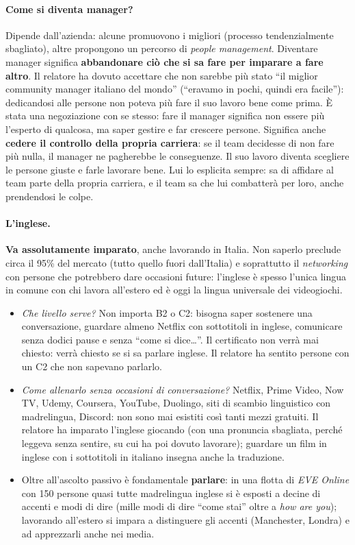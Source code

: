 \paragraph{Come si diventa manager?} Dipende dall'azienda: alcune promuovono i
migliori (processo tendenzialmente sbagliato), altre propongono un percorso di
\emph{people management}. Diventare manager significa \textbf{abbandonare ciò
che si sa fare per imparare a fare altro}. Il relatore ha dovuto accettare che
non sarebbe più stato ``il miglior community manager italiano del mondo''
(``eravamo in pochi, quindi era facile''): dedicandosi alle persone non poteva
più fare il suo lavoro bene come prima. È stata una negoziazione con se
stesso: fare il manager significa non essere più l'esperto di qualcosa, ma
saper gestire e far crescere persone. Significa anche \textbf{cedere il
controllo della propria carriera}: se il team decidesse di non fare più nulla,
il manager ne pagherebbe le conseguenze. Il suo lavoro diventa scegliere le
persone giuste e farle lavorare bene. Lui lo esplicita sempre: sa di affidare
al team parte della propria carriera, e il team sa che lui combatterà per
loro, anche prendendosi le colpe.

\paragraph{L'inglese.} \textbf{Va assolutamente imparato}, anche lavorando in
Italia. Non saperlo preclude circa il 95\% del mercato (tutto quello fuori
dall'Italia) e soprattutto il \emph{networking} con persone che potrebbero dare
occasioni future: l'inglese è spesso l'unica lingua in comune con chi lavora
all'estero ed è oggi la lingua universale dei videogiochi.
\begin{itemize}
  \item \emph{Che livello serve?} Non importa B2 o C2: bisogna saper sostenere
        una conversazione, guardare almeno Netflix con sottotitoli in inglese,
        comunicare senza dodici pause e senza ``come si dice\dots''. Il
        certificato non verrà mai chiesto: verrà chiesto se si sa parlare
        inglese. Il relatore ha sentito persone con un C2 che non sapevano
        parlarlo.
  \item \emph{Come allenarlo senza occasioni di conversazione?} Netflix, Prime
        Video, Now TV, Udemy, Coursera, YouTube, Duolingo, siti di scambio
        linguistico con madrelingua, Discord: non sono mai esistiti così tanti
        mezzi gratuiti. Il relatore ha imparato l'inglese giocando (con una
        pronuncia sbagliata, perché leggeva senza sentire, su cui ha poi
        dovuto lavorare); guardare un film in inglese con i sottotitoli in
        italiano insegna anche la traduzione.
  \item Oltre all'ascolto passivo è fondamentale \textbf{parlare}: in una
        flotta di \emph{EVE Online} con 150 persone quasi tutte madrelingua
        inglese si è esposti a decine di accenti e modi di dire (mille modi di
        dire ``come stai'' oltre a \emph{how are you}); lavorando all'estero si
        impara a distinguere gli accenti (Manchester, Londra) e ad apprezzarli
        anche nei media.
\end{itemize}

